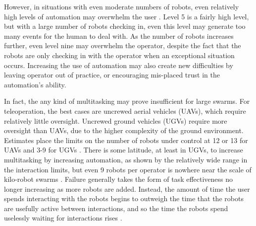 \documentclass[]{article}
\begin{document}
However, in situations with even moderate numbers of robots, even relatively high levels of automation may overwhelm the user . 
Level 5 is a fairly high level, but with a large number of robots checking in, even this level may generate too many events for the human to deal with. 
As the number of robots increases further, even level nine may overwhelm the operator, despite the fact that the robots are only checking in with the operator when an exceptional situation occurs. 
Increasing the use of automation may also create new difficulties by leaving operator out of practice, or encouraging mis-placed trust in the automation's ability. 

In fact, the any kind of multitasking may prove insufficient for large swarms. 
For teleoperation, the best cases are uncrewed aerial vehicles (UAVs), which require relatively little oversight. 
Uncrewed ground vehicles (UGVs) require more oversight than UAVs, due to the higher complexity of the ground environment. 
Estimates place the limits on the number of robots under control at 12 or 13 for UAVs and 3-9 for UGVs \cite{WangSearchScale}.  
There is some latitude, at least in UGVs, to increase multitasking by increasing automation, as shown by the relatively wide range in the interaction limits, but even 9 robots per operator is nowhere near the scale of kilo-robot swarms  \cite{Olsen:2004:FMH:985692.985722}.
Failure generally takes the form of task effectiveness no longer increasing as more robots are added.
Instead, the amount of time the user spends interacting with the robots begins to outweigh the time that the robots are usefully active between interactions, and so the time the robots spend uselessly waiting for interactions rises . 
\end{document}
